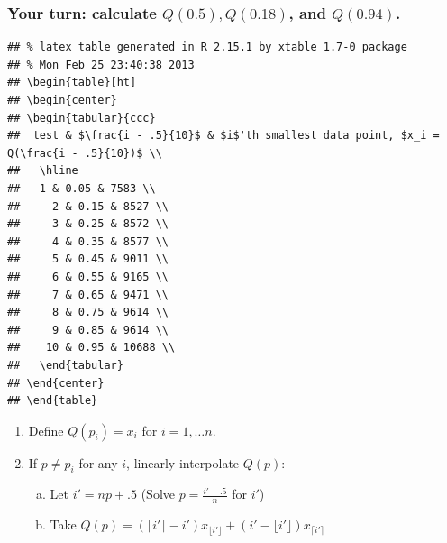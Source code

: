 \documentclass[handout]{beamer}\usepackage{graphicx, color}
\makeatletter
\newenvironment{kframe}{%
 \def\at@end@of@kframe{}%
 \ifinner\ifhmode%
  \def\at@end@of@kframe{\end{minipage}}%
  \begin{minipage}{\columnwidth}%
 \fi\fi%
 \def\FrameCommand##1{\hskip\@totalleftmargin \hskip-\fboxsep
 \colorbox{shadecolor}{##1}\hskip-\fboxsep
     \hskip-\linewidth \hskip-\@totalleftmargin \hskip\columnwidth}%
 \MakeFramed {\advance\hsize-\width
   \@totalleftmargin\z@ \linewidth\hsize
   \@setminipage}}%
 {\par\unskip\endMakeFramed%
 \at@end@of@kframe}
\newenvironment{knitrout}{}{} %
\numberwithin{equation}{section}
\makeatother
\begin{document}
\begin{frame}[fragile]
\frametitle{\small Your turn: calculate $Q(0.5), Q(0.18)$, and $Q(0.94)$.} \small

\begin{knitrout}
\color{fgcolor}\begin{kframe}
\begin{verbatim}
## % latex table generated in R 2.15.1 by xtable 1.7-0 package
## % Mon Feb 25 23:40:38 2013
## \begin{table}[ht]
## \begin{center}
## \begin{tabular}{ccc}
##  test & $\frac{i - .5}{10}$ & $i$'th smallest data point, $x_i = Q(\frac{i - .5}{10})$ \\ 
##   \hline
##   1 & 0.05 & 7583 \\ 
##     2 & 0.15 & 8527 \\ 
##     3 & 0.25 & 8572 \\ 
##     4 & 0.35 & 8577 \\ 
##     5 & 0.45 & 9011 \\ 
##     6 & 0.55 & 9165 \\ 
##     7 & 0.65 & 9471 \\ 
##     8 & 0.75 & 9614 \\ 
##     9 & 0.85 & 9614 \\ 
##    10 & 0.95 & 10688 \\ 
##   \end{tabular}
## \end{center}
## \end{table}
\end{verbatim}
\end{kframe}
\end{knitrout}


\begin{enumerate}
\item Define $Q(p_i) = x_i $ for $i = 1, \ldots n$.
\item If $p \ne p_i$ for any $i$, linearly interpolate $Q(p)$:
\begin{enumerate}[a. ]
\item Let $i' = np+.5$ (Solve $p = \frac{i'-.5}{n}$ for $i'$)
\item Take $Q(p) = (\lceil i' \rceil -i')x_{\lfloor i' \rfloor} + (i'-\lfloor i' \rfloor)x_{\lceil i' \rceil}$ 
\end{enumerate}
\end{enumerate} 
\end{frame}
\end{document}
